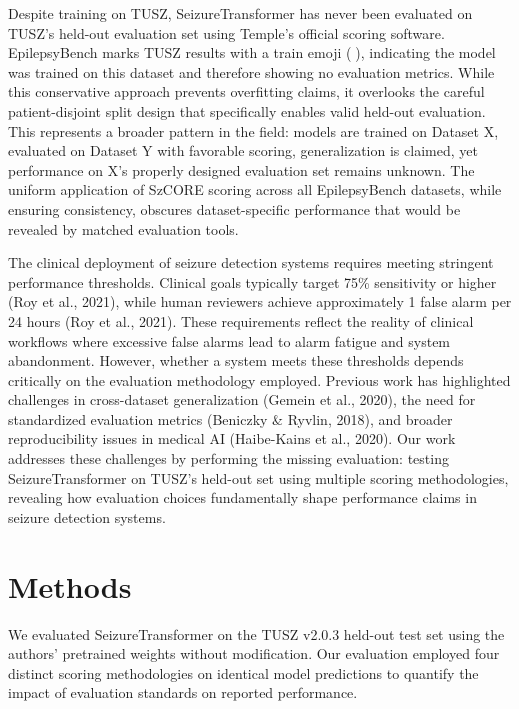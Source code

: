\documentclass[
  10pt,
]{article}
\begin{document}
Despite training on TUSZ, SeizureTransformer has never been evaluated on
TUSZ's held-out evaluation set using Temple's official scoring software.
EpilepsyBench marks TUSZ results with a train emoji (🚂), indicating the
model was trained on this dataset and therefore showing no evaluation
metrics. While this conservative approach prevents overfitting claims,
it overlooks the careful patient-disjoint split design that specifically
enables valid held-out evaluation. This represents a broader pattern in
the field: models are trained on Dataset X, evaluated on Dataset Y with
favorable scoring, generalization is claimed, yet performance on X's
properly designed evaluation set remains unknown. The uniform
application of SzCORE scoring across all EpilepsyBench datasets, while
ensuring consistency, obscures dataset-specific performance that would
be revealed by matched evaluation tools.

The clinical deployment of seizure detection systems requires meeting
stringent performance thresholds. Clinical goals typically target 75\%
sensitivity or higher (Roy et al., 2021), while human reviewers achieve
approximately 1 false alarm per 24 hours (Roy et al., 2021). These
requirements reflect the reality of clinical workflows where excessive
false alarms lead to alarm fatigue and system abandonment. However,
whether a system meets these thresholds depends critically on the
evaluation methodology employed. Previous work has highlighted
challenges in cross-dataset generalization (Gemein et al., 2020), the
need for standardized evaluation metrics (Beniczky \& Ryvlin, 2018), and
broader reproducibility issues in medical AI (Haibe-Kains et al., 2020).
Our work addresses these challenges by performing the missing
evaluation: testing SeizureTransformer on TUSZ's held-out set using
multiple scoring methodologies, revealing how evaluation choices
fundamentally shape performance claims in seizure detection systems.



\hypertarget{methods}{%
\section{Methods}\label{methods}}

We evaluated SeizureTransformer on the TUSZ v2.0.3 held-out test set
using the authors' pretrained weights without modification. Our
evaluation employed four distinct scoring methodologies on identical
model predictions to quantify the impact of evaluation standards on
reported performance.
\end{document}

